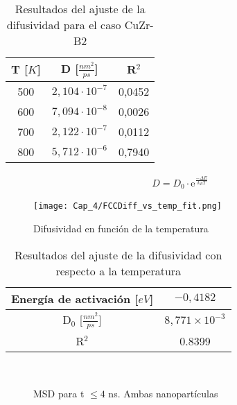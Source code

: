 \begin{table}[htp]
\caption{Resultados del ajuste de la difusividad para el caso CuZr-B2}
\begin{center}
\begin{tabular}{*{3}{c}}
\hline
T [$K$] & D [$\frac{nm^{2}}{ps}$] & R$^{2}$ \\
\hline \hline
500 & $2,104\cdot 10^{-7}$ & 0,0452 \\
\hline
600 & $7,094\cdot 10^{-8}$ & 0,0026 \\
\hline
700 & $2,122\cdot 10^{-7}$ & 0,0112 \\
\hline
800 & $5,712\cdot 10^{-6}$ & 0,7940 \\
\hline
\end{tabular}
\end{center}
\label{C4:tb:B2_Diff_Fit_Restults}
\end{table}

\begin{eqnarray}
D = D_{0}\cdot \mathrm{e}^{\frac{-\Delta E}{k_{B} T}}
\label{C4:eq:diff_Fit}
\end{eqnarray}

\begin{figure}[htp]
\centering
\texttt{[image: Cap\_4/FCCDiff\_vs\_temp\_fit.png]}
\caption[Difusividad en función de la temperatura]{Difusividad en función de la temperatura}
\label{C4:fg:FCC_diff_vs_T}
\end{figure}

\begin{table}[htp]
\caption{Resultados del ajuste de la difusividad con respecto a la temperatura}
\begin{center}
\begin{tabular}{*{2}{c}}
\hline
Energía de activación [$eV$]& $-0,4182$ \\
\hline \hline
D$_{0}$ [$\frac{nm^{2}}{ps}$] & $8,771\times 10^{-3}$\\
\hline
R$^{2}$ & 0.8399 \\
\hline
\end{tabular}
\end{center}
\label{C4:tb:FCC_Diff_VS_T_Fit_Restults}
\end{table}

\begin{figure}[htp]
\centering
{}
\\
\caption[MSD para t $ \leq 4 $ ns. Ambas nanopartículas]{MSD para t $ \leq 4 $ ns. Ambas nanopartículas}
\label{C4:fg:heating_FCC_B2}
\end{figure}

